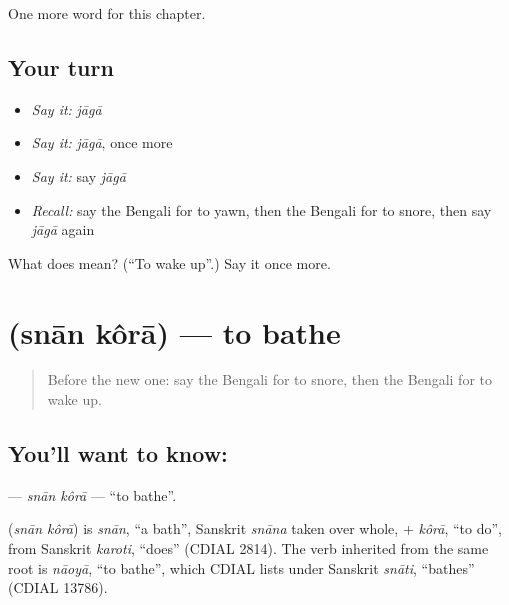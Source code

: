 \begin{grammarlens}[title={What you've built}]
One more word for this chapter.
\end{grammarlens}

\subsection*{Your turn}
\begin{itemize}
\raggedright
  \item \emph{Say it:} \emph{jāgā}
  \item \emph{Say it:} \emph{jāgā}, once more
  \item \emph{Say it:} say \emph{jāgā}
  \item \emph{Recall:} say the Bengali for to yawn, then the Bengali for to snore, then say \emph{jāgā} again
\end{itemize}

\begin{tcolorbox}[breakable,colback=teal!4,colframe=teal!35!black,title={Before you move on}]
What does  mean? (\textquotedblleft{}To wake up\textquotedblright{}.) Say it once more.
\end{tcolorbox}
\section[\texorpdfstring{\bn{স্নান} \bn{করা} (snān kôrā)}{স্নান করা (snān kôrā)}]{  (snān kôrā) — to bathe}

\label{lesson:BN-C183-snan-kora}



\begin{quote}
Before the new one: say the Bengali for to snore, then the Bengali for to wake up.
\end{quote}

\subsection*{You'll want to know:  }
\textbf{ } — \emph{snān kôrā} — \textquotedblleft{}to bathe\textquotedblright{}.

\begin{cousinweb}
\textbf{ } (\emph{snān kôrā}) is \emph{snān}, \textquotedblleft{}a bath\textquotedblright{}, Sanskrit \emph{snāna} taken over whole, + \emph{kôrā}, \textquotedblleft{}to do\textquotedblright{}, from Sanskrit \emph{karoti}, \textquotedblleft{}does\textquotedblright{} (CDIAL 2814). The verb inherited from the same root is \emph{nāoyā}, \textquotedblleft{}to bathe\textquotedblright{}, which CDIAL lists under Sanskrit \emph{snāti}, \textquotedblleft{}bathes\textquotedblright{} (CDIAL 13786).
\end{cousinweb}

